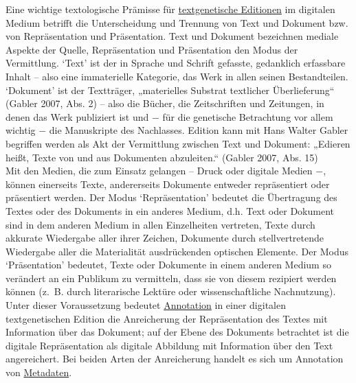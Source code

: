 \documentclass{article}
\begin{document}
    Eine wichtige textologische Prämisse für \href{http://gams.uni-graz.at/o:konde.90}{textgenetische Editionen} im digitalen Medium betrifft die Unterscheidung
                  und Trennung von Text und Dokument bzw. von Repräsentation und Präsentation. Text
                  und Dokument bezeichnen mediale Aspekte der Quelle, Repräsentation und
                  Präsentation den Modus der Vermittlung. ‘Text’ ist der in Sprache und Schrift
                  gefasste, gedanklich erfassbare Inhalt – also eine immaterielle Kategorie, das
                  Werk in allen seinen Bestandteilen. ‘Dokument’ ist der Textträger, „materielles
                  Substrat textlicher Überlieferung“ (Gabler 2007, Abs. 2) – also die
                  Bücher, die Zeitschriften und Zeitungen, in denen das Werk publiziert ist und −
                  für die genetische Betrachtung vor allem wichtig − die Manuskripte des Nachlasses.
                  Edition kann mit Hans Walter Gabler begriffen werden als Akt der Vermittlung
                  zwischen Text und Dokument: „Edieren heißt, Texte von und aus Dokumenten
                  abzuleiten.“ (Gabler 2007, Abs. 15)\\
            
        Mit den Medien, die zum Einsatz gelangen – Druck oder digitale Medien −, können
                  einerseits Texte, andererseits Dokumente entweder repräsentiert oder präsentiert
                  werden. Der Modus ‘Repräsentation’ bedeutet die Übertragung des Textes oder des
                  Dokuments in ein anderes Medium, d.h. Text oder Dokument sind in dem anderen
                  Medium in allen Einzelheiten vertreten, Texte durch akkurate Wiedergabe aller
                  ihrer Zeichen, Dokumente durch stellvertretende Wiedergabe aller die Materialität
                  ausdrückenden optischen Elemente. Der Modus ‘Präsentation’ bedeutet, Texte oder
                  Dokumente in einem anderen Medium so verändert an ein Publikum zu vermitteln, dass
                  sie von diesem rezipiert werden können (z. B. durch literarische Lektüre oder
                  wissenschaftliche Nachnutzung). Unter dieser Voraussetzung bedeutet \href{http://gams.uni-graz.at/o:konde.17}{Annotation} in einer digitalen
                  textgenetischen Edition die Anreicherung der Repräsentation des Textes mit
                  Information über das Dokument; auf der Ebene des Dokuments betrachtet ist die
                  digitale Repräsentation als digitale Abbildung mit Information über den Text
                  angereichert. Bei beiden Arten der Anreicherung handelt es sich um Annotation von
                     \href{http://gams.uni-graz.at/o:konde.25}{Metadaten}. \\
            
\end{document}
